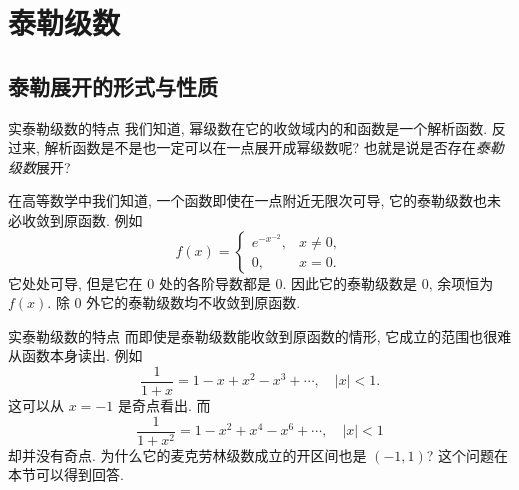 \section{泰勒级数}

\subsection{泰勒展开的形式与性质}

\begin{frame}{实泰勒级数的特点}
	\onslide<+->
	我们知道, 幂级数在它的收敛域内的和函数是一个解析函数.
	\onslide<+->
	反过来, 解析函数是不是也一定可以在一点展开成幂级数呢? 也就是说是否存在\emph{泰勒级数}展开?

	\onslide<+->
	在高等数学中我们知道, 一个函数即使在一点附近无限次可导, 它的泰勒级数也未必收敛到原函数.
	\onslide<+->
	例如
	\[f(x)=\begin{cases}
	e^{-x^{-2}},&x\neq 0,\\
	0,&x=0.\end{cases}\]
	\onslide<+->
	它处处可导, 但是它在 $0$ 处的各阶导数都是 $0$.
	\onslide<+->
	因此它的泰勒级数是 $0$, 余项恒为 $f(x)$.
	\onslide<+->
	除 $0$ 外它的泰勒级数均不收敛到原函数.
\end{frame}


\begin{frame}{实泰勒级数的特点}
	\onslide<+->
	而即使是泰勒级数能收敛到原函数的情形, 它成立的范围也很难从函数本身读出.
	\onslide<+->
	例如
	\[\dfrac1{1+x}=1-x+x^2-x^3+\cdots,\quad|x|<1.\]
	\onslide<+->
	这可以从 $x=-1$ 是奇点看出.
	\onslide<+->
	而
	\[\dfrac1{1+x^2}=1-x^2+x^4-x^6+\cdots,\quad|x|<1\]
	却并没有奇点.
	\onslide<+->
	为什么它的麦克劳林级数成立的开区间也是 $(-1,1)$?
	\onslide<+->
	这个问题在本节可以得到回答.
\end{frame}


